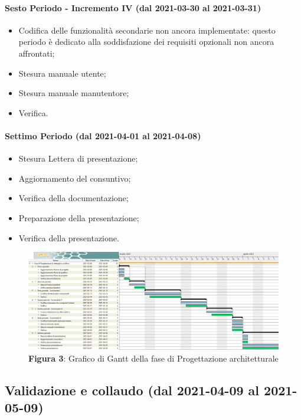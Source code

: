 \paragraph{Sesto Periodo - Incremento IV (dal 2021-03-30 al 2021-03-31)}
\begin{itemize}
	\item Codifica delle funzionalità secondarie non ancora implementate: questo periodo è dedicato alla soddisfazione dei requisiti opzionali non ancora affrontati;
	\item Stesura manuale utente;
	\item Stesura manuale manutentore;
	\item Verifica.
\end{itemize}

\paragraph{Settimo Periodo (dal 2021-04-01 al 2021-04-08)}
\begin{itemize}
	\item Stesura Lettera di presentazione;
	\item Aggiornamento del consuntivo;
	\item Verifica della documentazione;
	\item Preparazione della presentazione;
	\item Verifica della presentazione.
\end{itemize}

\begin{landscape}
	\begin{figure}[H]
		\centering
		\includegraphics[width=\linewidth]{res/images/ganttFase3.png}
		\caption*{\textbf{Figura 3}{: Grafico di Gantt della fase di Progettazione architetturale}}
		\label{fig:Gantt Analisi dei requisiti}
	\end{figure}
\end{landscape}

\subsection{Validazione e collaudo (dal 2021-04-09 al 2021-05-09)}

